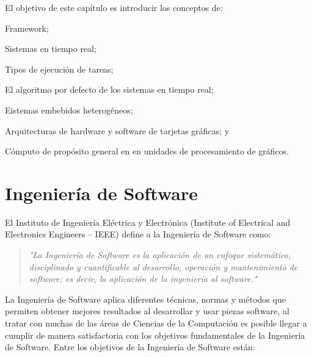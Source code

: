 
    El objetivo de este capítulo es introducir los conceptos de: 
    \begin{inparaenum}
    \item Framework;
    \item Sistemas en tiempo real;
    \item Tipos de ejecución de tareas; 
    \item El algoritmo por defecto de los sistemas en tiempo real; 
    \item Eistemas embebidos heterogéneos; 
    \item Arquitecturas de hardware y software de tarjetas gráficas; y 
    \item Cómputo de propósito general en en unidades de procesamiento de gráficos.
    \end{inparaenum}
     \section{Ingeniería de Software}

 El Instituto de Ingeniería Eléctrica y Electrónica (Institute of Electrical and Electronics Engineers – IEEE) define a la Ingeniería de Software como:

\begin{quote}
\textit{"La Ingeniería de Software\cite{IeeeSG} es la aplicación de un enfoque sistemático, disciplinado y cuantificable al desarrollo, operación y mantenimiento de software; es decir, la aplicación de la ingeniería al software."}
\end{quote}

La Ingeniería de Software aplica diferentes técnicas, normas y métodos que permiten obtener mejores resultados al desarrollar y usar piezas software, al tratar con muchas de las áreas de Ciencias de la Computación es posible llegar a cumplir de manera satisfactoria con los objetivos fundamentales de la Ingeniería de Software. Entre los objetivos de la Ingeniería de Software están\cite{enSWE}:

